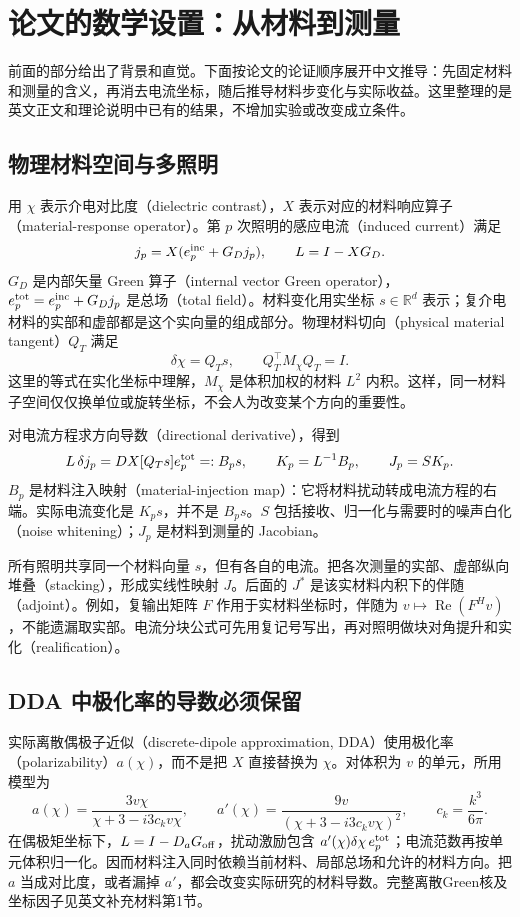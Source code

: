\section{论文的数学设置：从材料到测量}
前面的部分给出了背景和直觉。下面按论文的论证顺序展开中文推导：先固定材料和测量的含义，再消去电流坐标，随后推导材料步变化与实际收益。这里整理的是英文正文和理论说明中已有的结果，不增加实验或改变成立条件。

\subsection{物理材料空间与多照明}
用 $\chi$ 表示介电对比度（dielectric contrast），$X$ 表示对应的材料响应算子（material-response operator）。第 $p$ 次照明的感应电流（induced current）满足
\begin{equation}
 j_p=X(e_p^{\rm inc}+G_Dj_p),\qquad L=I-XG_D.
\end{equation}
$G_D$ 是内部矢量 Green 算子（internal vector Green operator），$e_p^{\rm tot}=e_p^{\rm inc}+G_Dj_p$ 是总场（total field）。材料变化用实坐标 $s\in\mathbb R^d$ 表示；复介电材料的实部和虚部都是这个实向量的组成部分。物理材料切向（physical material tangent）$Q_T$ 满足
\begin{equation}
 \delta\chi=Q_Ts,\qquad Q_T^\top M_\chi Q_T=I.
\end{equation}
这里的等式在实化坐标中理解，$M_\chi$ 是体积加权的材料 $L^2$ 内积。这样，同一材料子空间仅仅换单位或旋转坐标，不会人为改变某个方向的重要性。

对电流方程求方向导数（directional derivative），得到
\begin{equation}
 L\,\delta j_p=DX[Q_Ts]e_p^{\rm tot}=:B_ps,
 \qquad K_p=L^{-1}B_p,\qquad J_p=SK_p.
\end{equation}
$B_p$ 是材料注入映射（material-injection map）：它将材料扰动转成电流方程的右端。实际电流变化是 $K_ps$，并不是 $B_ps$。$S$ 包括接收、归一化与需要时的噪声白化（noise whitening）；$J_p$ 是材料到测量的 Jacobian。

所有照明共享同一个材料向量 $s$，但有各自的电流。把各次测量的实部、虚部纵向堆叠（stacking），形成实线性映射 $J$。后面的 $J^*$ 是该实材料内积下的伴随（adjoint）。例如，复输出矩阵 $F$ 作用于实材料坐标时，伴随为 $v\mapsto\operatorname{Re}(F^Hv)$，不能遗漏取实部。电流分块公式可先用复记号写出，再对照明做块对角提升和实化（realification）。

\subsection{DDA 中极化率的导数必须保留}
实际离散偶极子近似（discrete-dipole approximation, DDA）使用极化率（polarizability）$a(\chi)$，而不是把 $X$ 直接替换为 $\chi$。对体积为 $v$ 的单元，所用模型为
\begin{equation}
 a(\chi)=\frac{3v\chi}{\chi+3-i3c_kv\chi},\qquad
 a'(\chi)=\frac{9v}{(\chi+3-i3c_kv\chi)^2},\qquad c_k=\frac{k^3}{6\pi}.
\end{equation}
在偶极矩坐标下，$L=I-D_aG_{\rm off}$，扰动激励包含 $a'(\chi)\delta\chi\,e_p^{\rm tot}$；电流范数再按单元体积归一化。因而材料注入同时依赖当前材料、局部总场和允许的材料方向。把 $a$ 当成对比度，或者漏掉 $a'$，都会改变实际研究的材料导数。完整离散Green核及坐标因子见英文补充材料第1节。

